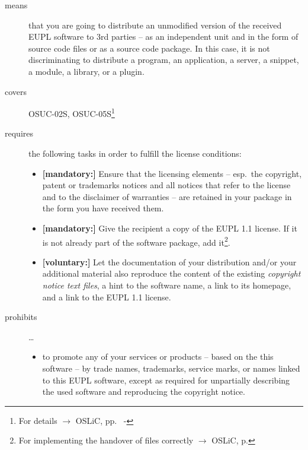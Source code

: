 \begin{description}

\item[means] that you are going to distribute an unmodified version of the
received EUPL software to 3rd parties -- as an independent unit and in the form
of source code files or as a source code package. In this case, it is not
discriminating to distribute a program, an application, a server, a
snippet, a module, a library, or a plugin.

\item[covers] OSUC-02S, OSUC-05S\footnote{For details $\rightarrow$
OSLiC, pp.\ \pageref{OSUC-02S-DEF} - \pageref{OSUC-05S-DEF}}

\item[requires] the following tasks in order to fulfill the license conditions:
\begin{itemize}
  
  \item \textbf{[mandatory:]} Ensure that the licensing elements -- esp.\ the
  copyright, patent or trademarks notices and all notices that refer to the
  license and to the disclaimer of warranties -- are retained in your package in
  the form you have received them.
  
  \item \textbf{[mandatory:]} Give the recipient a copy of the EUPL 1.1
  license. If it is not already part of the software package, add
  it\footnote{For implementing the handover of files correctly $\rightarrow$
  OSLiC, p. \pageref{DistributingFilesHint}}.
  
  \item \textbf{[voluntary:]} Let the documentation of your distribution and/or
  your additional material also reproduce the content of the existing
  \emph{copyright notice text files}, a hint to the software name, a link to its
  homepage, and a link to the EUPL 1.1 license.
\end{itemize}

\item[prohibits] \ldots
\begin{itemize}
  \item to promote any of your services or products -- based on the this software
  -- by trade names, trademarks, service marks, or names linked to this EUPL
  software, except as required for unpartially describing the used software and
  reproducing the copyright notice.
\end{itemize}

\end{description}


